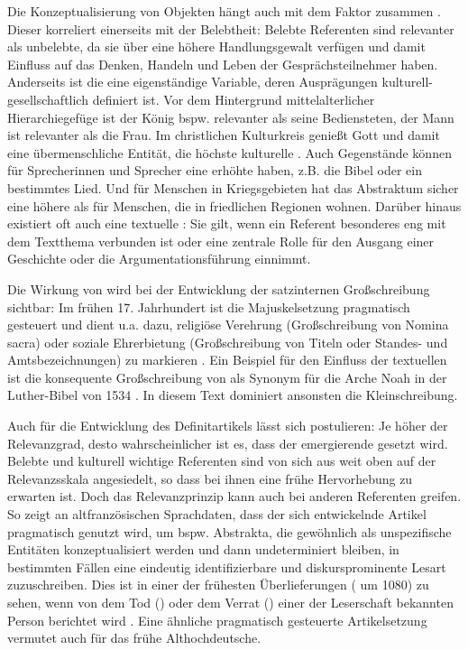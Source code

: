Die Konzeptualisierung von Objekten hängt auch mit dem Faktor  zusammen \parencite[s.][347]{Szczepaniak2011}.  
Dieser korreliert einerseits mit der  Belebtheit: Belebte Referenten sind relevanter als  unbelebte, da sie  über eine höhere Handlungsgewalt verfügen und damit Einfluss auf das Denken, Handeln und Leben der Gesprächsteilnehmer haben. Anderseits ist die  eine eigenständige Variable, deren Ausprägungen kulturell-gesellschaftlich definiert ist. Vor dem Hintergrund mittelalterlicher Hierarchiegefüge ist der König bspw. relevanter als seine Bediensteten, der Mann ist relevanter als die Frau. Im christlichen Kulturkreis genießt Gott und damit eine übermenschliche Entität, die höchste kulturelle . Auch Gegenstände können für Sprecherinnen und Sprecher eine erhöhte  haben, z.B. die Bibel oder ein bestimmtes Lied. Und für Menschen in Kriegsgebieten hat das Abstraktum   sicher eine höhere  als für Menschen, die in friedlichen Regionen wohnen.  Darüber hinaus existiert oft auch eine textuelle   \parencite[347]{Szczepaniak2011}: Sie gilt, wenn ein Referent besonderes eng mit dem Textthema verbunden ist oder eine zentrale Rolle für den Ausgang einer Geschichte oder die Argumentationsführung einnimmt.

Die Wirkung von  wird bei der Entwicklung der satzinternen Großschreibung sichtbar: Im frühen 17. Jahrhundert ist die Majuskelsetzung pragmatisch gesteuert und dient u.a. dazu, religiöse Verehrung (Großschreibung von Nomina sacra) oder soziale Ehrerbietung  (Großschreibung von Titeln oder Standes- und Amtsbezeichnungen) zu markieren \parencite[73]{Bergmann1999}. Ein Beispiel für den Einfluss der textuellen  ist die konsequente Großschreibung von  als Synonym für die Arche Noah in der Luther-Bibel von 1534 \parencite[352]{Szczepaniak2011}. In diesem Text dominiert ansonsten die Kleinschreibung.

Auch für die Entwicklung des Definitartikels  lässt sich postulieren: Je höher der  Relevanzgrad, desto wahrscheinlicher ist es, dass der emergierende  gesetzt wird. Belebte  und kulturell wichtige Referenten sind von sich aus weit oben auf der Relevanzsskala  angesiedelt, so dass bei ihnen eine frühe Hervorhebung zu erwarten ist. 
Doch das Relevanzprinzip  kann auch bei anderen Referenten greifen. So zeigt \textcite[]{Epstein1993,Epstein1994} an altfranzösischen Sprachdaten, dass der sich entwickelnde Artikel pragmatisch genutzt wird, um bspw. Abstrakta, die gewöhnlich als unspezifische Entitäten konzeptualisiert werden und dann undeterminiert bleiben, in bestimmten Fällen eine eindeutig identifizierbare und diskursprominente Lesart zuzuschreiben. Dies ist in einer der frühesten Überlieferungen  ( um 1080) zu sehen, wenn von dem Tod () oder dem Verrat () einer der Leserschaft bekannten Person berichtet wird \parencite[71--72]{Epstein1994}. Eine ähnliche pragmatisch gesteuerte Artikelsetzung vermutet auch \textcite[218]{Oubouzar1989} für das frühe Althochdeutsche. 

